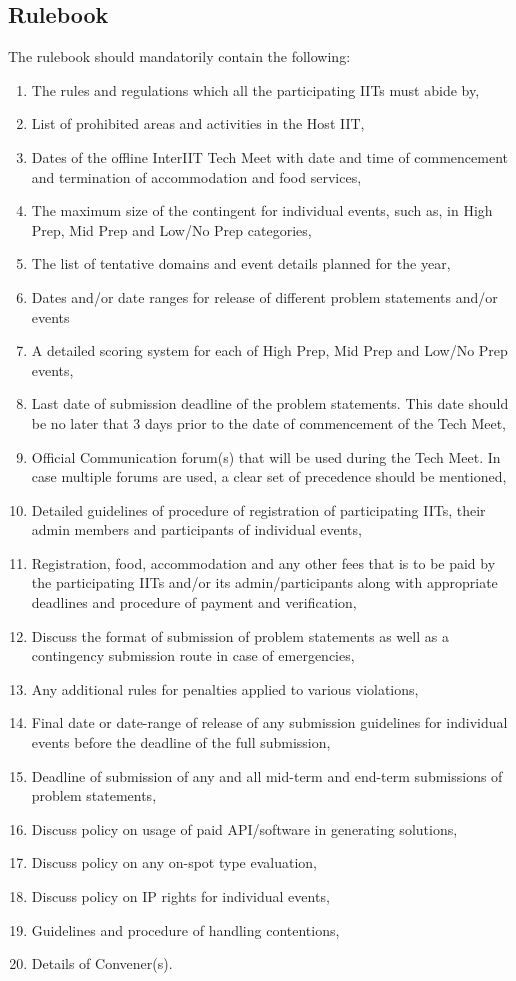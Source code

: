 \subsection{Rulebook}
The rulebook should mandatorily contain the following:
\begin{enumerate}
    \item The rules and regulations which all the participating IITs must abide by,
    \item List of prohibited areas and activities in the Host IIT,
    \item Dates of the offline InterIIT Tech Meet with date and time of commencement and termination of accommodation and food services,
    \item The maximum size of the contingent for individual events, such as, in High Prep, Mid Prep and Low/No Prep categories,
    \item The list of tentative domains and event details planned for the year,
    \item Dates and/or date ranges for release of different problem statements and/or events
    \item A detailed scoring system for each of High Prep, Mid Prep and Low/No Prep events,
    \item Last date of submission deadline of the problem statements. This date should be no later that 3 days prior to the date of commencement of the Tech Meet,
    \item Official Communication forum(s) that will be used during the Tech Meet. In case multiple forums are used, a clear set of precedence should be mentioned,
    \item Detailed guidelines of procedure of registration of participating IITs, their admin members and participants of individual events,
    \item Registration, food, accommodation and any other fees that is to be paid by the participating IITs and/or its admin/participants along with appropriate deadlines and procedure of payment and verification,
    \item Discuss the format of submission of problem statements as well as a contingency submission route in case of emergencies,
    \item Any additional rules for penalties applied to various violations, 
    \item Final date or date-range of release of any submission guidelines for individual events before the deadline of the full submission,
    \item Deadline of submission of any and all mid-term and end-term submissions of problem statements,
    \item Discuss policy on usage of paid API/software in generating solutions,
    \item Discuss policy on any on-spot type evaluation,
    \item Discuss policy on IP rights for individual events,
    \item Guidelines and procedure of handling contentions,
    \item Details of Convener(s).
\end{enumerate}


